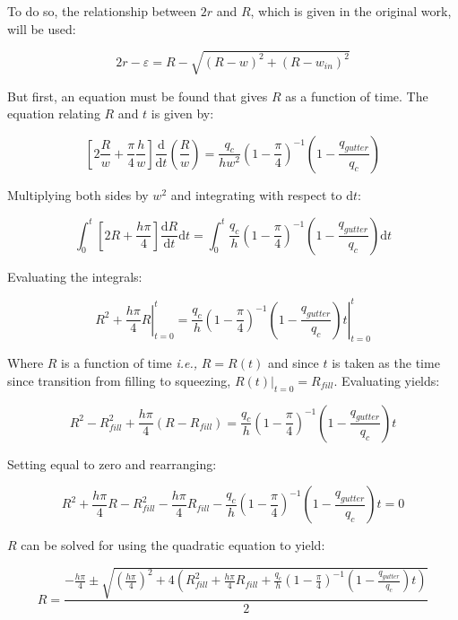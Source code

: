 To do so, the relationship between $2r$ and $R$, which is given in the original work, will be used:

\begin{equation}
  2r - \varepsilon = R - \sqrt{\left(R - w\right)^2 + \left(R - w_{in}\right)^2}
\end{equation}

But first, an equation must be found that gives $R$ as a function of time. The equation
relating $R$ and $t$ is given by:

\begin{equation}
  \left[2\frac{R}{w} + \frac{\pi}{4}\frac{h}{w}\right]
  \frac{\mathrm{d}}{\mathrm{d}t}\left(\frac{R}{w}\right) = 
  \frac{q_c}{hw^2} \left(1-\frac{\pi}{4}\right)^{-1}
  \left(1-\frac{q_{gutter}}{q_c}\right)
\end{equation}

Multiplying both sides by $w^2$ and integrating with respect to $\mathrm{d}t$:

$$
  \int_{0}^t{\left[2R + \frac{h\pi}{4}\right]
  \frac{\mathrm{d}R}{\mathrm{d}t}} \mathrm{d}t = 
  \int_{0}^t{\frac{q_c}{h} \left(1-\frac{\pi}{4}\right)^{-1}
  \left(1-\frac{q_{gutter}}{q_c}\right)} \mathrm{d}t
$$

Evaluating the integrals:

$$ 
  \left. R^2 + \frac{h\pi}{4}R \right|_{t=0}^{t}=
  \left. \frac{q_c}{h}
  \left(1-\frac{\pi}{4}\right)^{-1}
  \left(1-\frac{q_{gutter}}{q_c}\right)t \right|_{t=0}^{t}
$$

Where $R$ is a function of time \emph{i.e.,} $R=R\left(t\right)$ and since
$t$ is taken as the time since transition from filling to squeezing,
$\left. R\left(t\right)\right|_{t=0} = R_{fill}$. Evaluating yields:

$$
  R^2 - R_{fill}^2 + \frac{h\pi}{4}\left(R-R_{fill}\right) = 
  \frac{q_c}{h}
  \left(1-\frac{\pi}{4}\right)^{-1}
  \left(1-\frac{q_{gutter}}{q_c}\right)t
$$

Setting equal to zero and rearranging:

$$
  R^2 + \frac{h\pi}{4}R -
  R_{fill}^2 - \frac{h\pi}{4}R_{fill} -
  \frac{q_c}{h}
  \left(1-\frac{\pi}{4}\right)^{-1}
  \left(1-\frac{q_{gutter}}{q_c}\right)t = 0
$$

$R$ can be solved for using the quadratic equation to yield:

\begin{equation}
  R = \frac{-\frac{h\pi}{4} \pm 
  \sqrt{\left(\frac{h\pi}{4}\right)^2 +
  4\left(R_{fill}^2 + \frac{h\pi}{4}R_{fill} +
  \frac{q_c}{h}
  \left(1-\frac{\pi}{4}\right)^{-1}
  \left(1-\frac{q_{gutter}}{q_c}\right)t\right)}}{2}
\end{equation}

